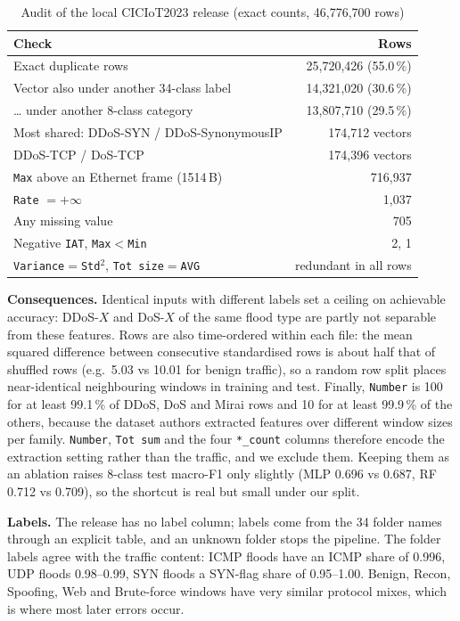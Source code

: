 \documentclass[conference]{IEEEtran}
\begin{document}
\begin{table}[t]
\caption{Audit of the local CICIoT2023 release (exact counts, 46,776,700 rows)}\label{tab:audit}
\centering\footnotesize
\setlength{\tabcolsep}{3pt}
\begin{tabular}{@{}lr@{}}
\toprule
Check & Rows \\
\midrule
Exact duplicate rows & 25,720,426 (55.0\,\%) \\
Vector also under another 34-class label & 14,321,020 (30.6\,\%) \\
\quad \ldots{} under another 8-class category & 13,807,710 (29.5\,\%) \\
Most shared: DDoS-SYN / DDoS-SynonymousIP & 174,712 vectors \\
\quad DDoS-TCP / DoS-TCP & 174,396 vectors \\
\texttt{Max} above an Ethernet frame (1514\,B) & 716,937 \\
\texttt{Rate} $=+\infty$ & 1,037 \\
Any missing value & 705 \\
Negative \texttt{IAT}, \texttt{Max}$<$\texttt{Min} & 2, 1 \\
\texttt{Variance}$=$\texttt{Std}$^2$, \texttt{Tot size}$=$\texttt{AVG} & redundant in all rows \\
\bottomrule
\end{tabular}
\end{table}

\textbf{Consequences.} Identical inputs with different labels set a ceiling on achievable accuracy: DDoS-$X$ and DoS-$X$ of the same flood type are partly not separable from these features. Rows are also time-ordered within each file: the mean squared difference between consecutive standardised rows is about half that of shuffled rows (e.g.\ 5.03 vs 10.01 for benign traffic), so a random row split places near-identical neighbouring windows in training and test. Finally, \texttt{Number} is 100 for at least 99.1\,\% of DDoS, DoS and Mirai rows and 10 for at least 99.9\,\% of the others, because the dataset authors extracted features over different window sizes per family. \texttt{Number}, \texttt{Tot sum} and the four \texttt{*\_count} columns therefore encode the extraction setting rather than the traffic, and we exclude them. Keeping them as an ablation raises 8-class test macro-F1 only slightly (MLP 0.696 vs 0.687, RF 0.712 vs 0.709), so the shortcut is real but small under our split.

\textbf{Labels.} The release has no label column; labels come from the 34 folder names through an explicit table, and an unknown folder stops the pipeline. The folder labels agree with the traffic content: ICMP floods have an ICMP share of 0.996, UDP floods 0.98--0.99, SYN floods a SYN-flag share of 0.95--1.00. Benign, Recon, Spoofing, Web and Brute-force windows have very similar protocol mixes, which is where most later errors occur.
\end{document}
